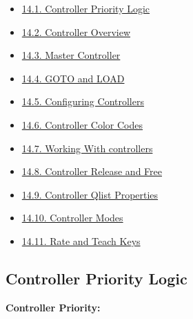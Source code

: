 \documentclass[
]{article}
\providecommand{\tightlist}{%
  \setlength{\itemsep}{0pt}\setlength{\parskip}{0pt}}
\begin{document}
\begin{itemize}
\tightlist
\item
  \href{https://vibemanual.compulite.com/playing-back-cues-and-scenes.html\#controller-priority-logic}{14.1. Controller Priority Logic}
\item
  \href{https://vibemanual.compulite.com/playing-back-cues-and-scenes.html\#controller-overview}{14.2. Controller Overview}
\item
  \href{https://vibemanual.compulite.com/playing-back-cues-and-scenes.html\#master-controller-1}{14.3. Master Controller}
\item
  \href{https://vibemanual.compulite.com/playing-back-cues-and-scenes.html\#goto-and-load}{14.4. GOTO and LOAD}
\item
  \href{https://vibemanual.compulite.com/playing-back-cues-and-scenes.html\#configuring-controllers}{14.5. Configuring Controllers}
\item
  \href{https://vibemanual.compulite.com/playing-back-cues-and-scenes.html\#controller-color-codes}{14.6. Controller Color Codes}
\item
  \href{https://vibemanual.compulite.com/playing-back-cues-and-scenes.html\#working-with-controllers}{14.7. Working With controllers}
\item
  \href{https://vibemanual.compulite.com/playing-back-cues-and-scenes.html\#controller-release-and-free}{14.8. Controller Release and Free}
\item
  \href{https://vibemanual.compulite.com/playing-back-cues-and-scenes.html\#controller-qlist-properties}{14.9. Controller Qlist Properties}
\item
  \href{https://vibemanual.compulite.com/playing-back-cues-and-scenes.html\#controller-modes}{14.10. Controller Modes}
\item
  \href{https://vibemanual.compulite.com/playing-back-cues-and-scenes.html\#rate-and-teach-keys}{14.11. Rate and Teach Keys}
\end{itemize}

\hypertarget{controller-priority-logic}{%
\subsection{Controller Priority Logic}\label{controller-priority-logic}}

\textbf{Controller Priority:}
\end{document}
